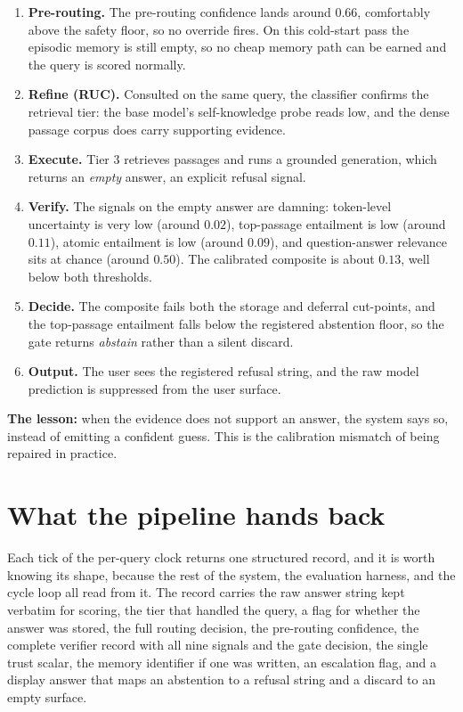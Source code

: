\begin{scenario}
\begin{enumerate}[leftmargin=1.5em, itemsep=2pt]
  \item \textbf{Pre-routing.} The pre-routing confidence lands around $0.66$,
  comfortably above the safety floor, so no override fires. On this cold-start
  pass the episodic memory is still empty, so no cheap memory path can be earned
  and the query is scored normally.
  \item \textbf{Refine (RUC).} Consulted on the same query, the classifier
  confirms the retrieval tier: the base model's self-knowledge probe reads low,
  and the dense passage corpus does carry supporting evidence.
  \item \textbf{Execute.} Tier 3 retrieves passages and runs a grounded
  generation, which returns an \emph{empty} answer, an explicit refusal signal.
  \item \textbf{Verify.} The signals on the empty answer are damning:
  token-level uncertainty is very low (around $0.02$), top-passage entailment is
  low (around $0.11$), atomic entailment is low (around $0.09$), and
  question-answer relevance sits at chance (around $0.50$). The calibrated
  composite is about $0.13$, well below both thresholds.
  \item \textbf{Decide.} The composite fails both the storage and deferral
  cut-points, and the top-passage entailment falls below the registered
  abstention floor, so the gate returns \emph{abstain} rather than a silent
  discard.
  \item \textbf{Output.} The user sees the registered refusal string, and the raw
  model prediction is suppressed from the user surface.
\end{enumerate}
\textbf{The lesson:} when the evidence does not support an answer, the system says
so, instead of emitting a confident guess. This is the calibration mismatch of
 being repaired in practice.
\end{scenario}

\section{What the pipeline hands back}
\label{sec:pipeline-result}

Each tick of the per-query clock returns one structured record, and it is worth
knowing its shape, because the rest of the system, the evaluation harness, and
the cycle loop all read from it. The record carries the raw answer string kept
verbatim for scoring, the tier that handled the query, a flag for whether the
answer was stored, the full routing decision, the pre-routing confidence, the
complete verifier record with all nine signals and the gate decision, the single
trust scalar, the memory identifier if one was written, an escalation flag, and a
display answer that maps an abstention to a refusal string and a discard to an
empty surface.


